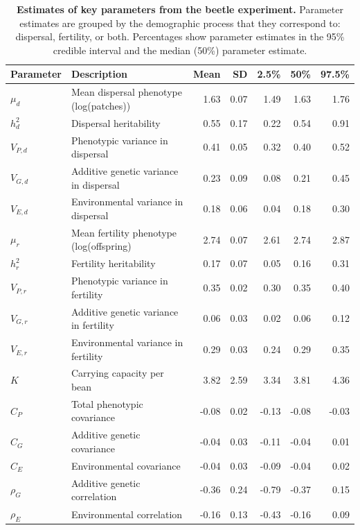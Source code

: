 \documentclass[11pt]{article}
\begin{document}
\renewcommand{\thetable}{\arabic{table}}
\setcounter{table}{0}

\newpage{}
\begin{table}[h]
\centering
\label{Estimates of key parameters from the beetle experiment}
\caption[Estimates of key parameters from the beetle experiment]{\textbf{Estimates of key parameters from the beetle experiment.} Parameter estimates are grouped by the demographic process that they correspond to: dispersal, fertility, or both. Percentages show parameter estimates in the 95\% credible interval and the median (50\%) parameter estimate.}\label{corr:estimates}\vspace{0.1in}
\begin{tabularx}{0.95\linewidth}{lXrrrrr}
\toprule
Parameter   & Description                               & Mean & SD   & 2.5\% & 50\% & 97.5\% \\ \midrule
$\mu_{d}$   & Mean dispersal phenotype (log(patches)) & 1.63 & 0.07 & 1.49   & 1.63 & 1.76   \\
$h^{2}_{d}$ & Dispersal heritability              & 0.55 & 0.17 & 0.22   & 0.54 & 0.91   \\
$V_{P,d}$   & Phenotypic variance in dispersal & 0.41 & 0.05 & 0.32   & 0.40 & 0.52   \\
$V_{G,d}$   & Additive genetic variance in dispersal & 0.23 & 0.09 & 0.08   & 0.21 & 0.45   \\
$V_{E,d}$   & Environmental variance in dispersal    & 0.18 & 0.06 & 0.04   & 0.18 & 0.30   \\ \midrule
$\mu_{r}$   & Mean fertility phenotype (log(offspring) & 2.74 & 0.07 & 2.61   & 2.74 & 2.87   \\
$h^{2}_{r}$ & Fertility heritability              & 0.17 & 0.07 & 0.05   & 0.16 & 0.31   \\
$V_{P,r}$   & Phenotypic variance in fertility & 0.35 & 0.02 & 0.30   & 0.35 & 0.40   \\
$V_{G,r}$   & Additive genetic variance in fertility & 0.06 & 0.03 & 0.02   & 0.06 & 0.12   \\
$V_{E,r}$   & Environmental variance in fertility    & 0.29 & 0.03 & 0.24   & 0.29 & 0.35   \\
$K$         & Carrying capacity per bean              & 3.82 & 2.59 & 3.34   & 3.81 & 4.36   \\ \midrule
$C_{P}$     & Total phenotypic covariance    &-0.08 & 0.02 &-0.13   &-0.08 &-0.03   \\
$C_{G}$     & Additive genetic covariance &-0.04 & 0.03 &-0.11   &-0.04 & 0.01   \\
$C_{E}$     & Environmental covariance   &-0.04 & 0.03 &-0.09   &-0.04 & 0.02   \\
$\rho_{G}$  & Additive genetic correlation  &-0.36 & 0.24 &-0.79   &-0.37 & 0.15   \\
$\rho_{E}$  & Environmental correlation     &-0.16 & 0.13 &-0.43   &-0.16 & 0.09   \\
\bottomrule
\end{tabularx}
\end{table}
\end{document}
